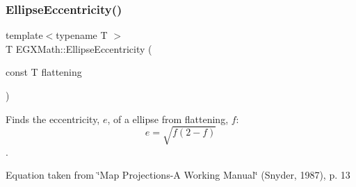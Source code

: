 \subsubsection{\texorpdfstring{Ellipse\+Eccentricity()}{EllipseEccentricity()}\hspace{0.1cm}{\footnotesize\ttfamily [1/2]}}
{\footnotesize\ttfamily template$<$typename T $>$ \\
T E\+G\+X\+Math\+::\+Ellipse\+Eccentricity (\begin{DoxyParamCaption}\item[{const T}]{flattening }\end{DoxyParamCaption})}



Finds the eccentricity, $e$, of a ellipse from flattening, $f$\+: \[ e = \sqrt{f (2 - f)} \]. 

Equation taken from \char`\"{}\+Map Projections-\/\+A Working Manual\char`\"{} (Snyder, 1987), p. 13

